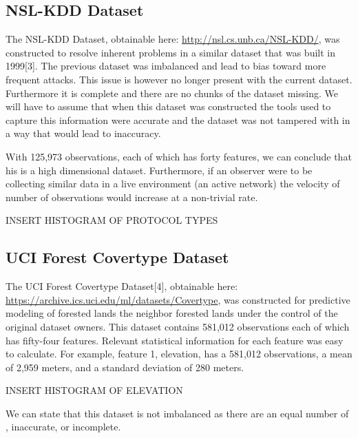 \documentclass[twoside]{article}
\begin{document}
\begin{multicols}{2}
\subsection{NSL-KDD Dataset}
The NSL-KDD Dataset, obtainable here: \url{http://nsl.cs.unb.ca/NSL-KDD/}, was constructed to resolve inherent problems in a similar dataset that
was built in 1999[3]. The previous dataset was imbalanced and lead to bias toward more frequent
attacks. This issue is however no longer present with the current dataset. Furthermore it is complete and there are no chunks of the dataset missing. We will have to assume that when this dataset was constructed the tools used to capture this information were accurate and the dataset was not tampered with in a way that would lead to inaccuracy.

With 125,973 observations, each of which has forty features, we can conclude that his is a high dimensional dataset. Furthermore, if an observer were to be collecting similar data in a live environment (an active network) the velocity of number of observations would increase at a non-trivial rate.

INSERT HISTOGRAM OF PROTOCOL TYPES

\subsection{UCI Forest Covertype Dataset}
The UCI Forest Covertype Dataset[4], obtainable here: \url{https://archive.ics.uci.edu/ml/datasets/Covertype}, was constructed for predictive modeling of forested lands the neighbor forested lands under the control of the original dataset owners. This dataset contains 581,012 observations each of which has fifty-four features. Relevant statistical information for each feature was easy to calculate. For example, feature 1, elevation, has a 581,012 observations, a mean of 2,959 meters, and a standard deviation of 280 meters. 

INSERT HISTOGRAM OF ELEVATION 

We can state that this dataset is not imbalanced as there are an equal number of , inaccurate, or incomplete.



\end{multicols}
\end{document}
